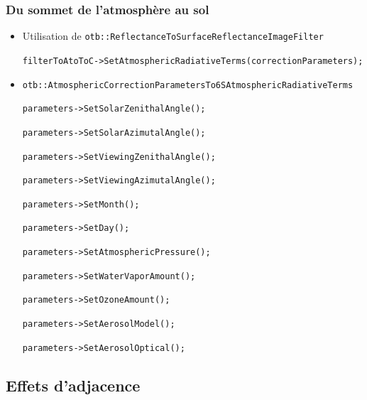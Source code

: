 \documentclass[compress,handout]{beamer}
\begin{document}
\begin{frame}

  \frametitle{Du sommet de l'atmosphère au sol}
  \begin{itemize}
  \tiny
  \item Utilisation de \texttt{otb::ReflectanceToSurfaceReflectanceImageFilter}

  \texttt{filterToAtoToC->SetAtmosphericRadiativeTerms(correctionParameters);}

  \item \texttt{otb::AtmosphericCorrectionParametersTo6SAtmosphericRadiativeTerms} 

\texttt{parameters->SetSolarZenithalAngle();}

\texttt{parameters->SetSolarAzimutalAngle();}

\texttt{parameters->SetViewingZenithalAngle();}

\texttt{parameters->SetViewingAzimutalAngle();}

\texttt{parameters->SetMonth();}

\texttt{parameters->SetDay();}

\texttt{parameters->SetAtmosphericPressure();}

\texttt{parameters->SetWaterVaporAmount();}

\texttt{parameters->SetOzoneAmount();}

\texttt{parameters->SetAerosolModel();}

\texttt{parameters->SetAerosolOptical();}
\end{itemize}
\end{frame}


\subsection[Adjacence]{Effets d'adjacence}
\end{document}
